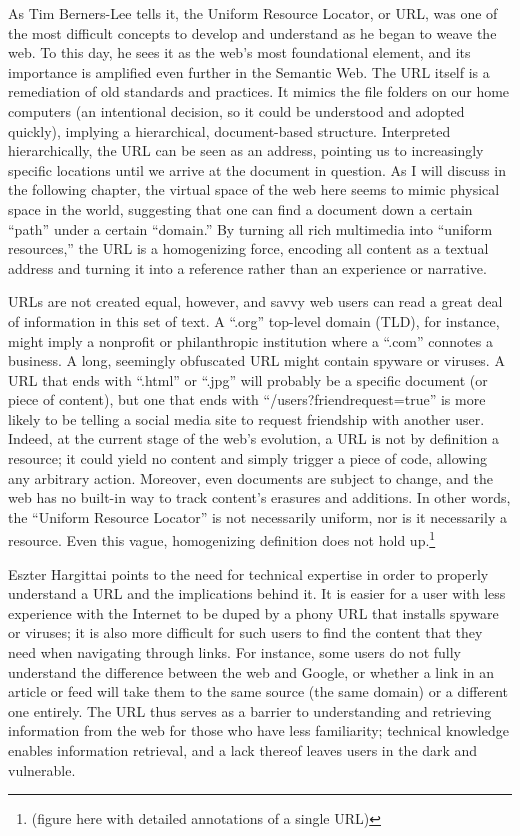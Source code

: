 As Tim Berners-Lee tells it, the Uniform Resource Locator, or URL, was one of the most difficult concepts to develop and understand as he began to weave the web.\autocite[FIND PAGE]{berners-lee_weaving_2000} To this day, he sees it as the web's most foundational element, and its importance is amplified even further in the Semantic Web. The URL itself is a remediation of old standards and practices. It mimics the file folders on our home computers (an intentional decision, so it could be understood and adopted quickly), implying a hierarchical, document-based structure. Interpreted hierarchically, the URL can be seen as an address, pointing us to increasingly specific locations until we arrive at the document in question. As I will discuss in the following chapter, the virtual space of the web here seems to mimic physical space in the world, suggesting that one can find a document down a certain ``path'' under a certain ``domain.'' By turning all rich multimedia into ``uniform resources,'' the URL is a homogenizing force, encoding all content as a textual address and turning it into a reference rather than an experience or narrative.

URLs are not created equal, however, and savvy web users can read a great deal of information in this set of text. A ``.org'' top-level domain (TLD), for instance, might imply a nonprofit or philanthropic institution where a ``.com'' connotes a business. A long, seemingly obfuscated URL might contain spyware or viruses. A URL that ends with ``.html'' or ``.jpg'' will probably be a specific document (or piece of content), but one that ends with ``/users?friendrequest=true'' is more likely to be telling a social media site to request friendship with another user. Indeed, at the current stage of the web's evolution, a URL is not by definition a resource; it could yield no content and simply trigger a piece of code, allowing any arbitrary action. Moreover, even documents are subject to change, and the web has no built-in way to track content's erasures and additions. In other words, the ``Uniform Resource Locator'' is not necessarily uniform, nor is it necessarily a resource. Even this vague, homogenizing definition does not hold up.\footnote{(figure here with detailed annotations of a single URL)}

Eszter Hargittai points to the need for technical expertise in order to properly understand a URL and the implications behind it.\autocite{hargittai_role_2008} It is easier for a user with less experience with the Internet to be duped by a phony URL that installs spyware or viruses; it is also more difficult for such users to find the content that they need when navigating through links. For instance, some users do not fully understand the difference between the web and Google, or whether a link in an article or feed will take them to the same source (the same domain) or a different one entirely. The URL thus serves as a barrier to understanding and retrieving information from the web for those who have less familiarity; technical knowledge enables information retrieval, and a lack thereof leaves users in the dark and vulnerable.

